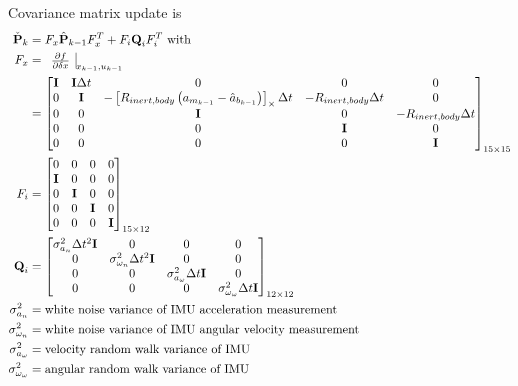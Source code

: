 \documentclass{article}
\begin{document}
Covariance matrix update is
\begin{align}
    \Check{\textbf{P}}_k &= F_x\hat{\textbf{P}}_{k-1}F_x^T + F_i\textbf{Q}_iF_i^T \text{ with} \\
    F_x &=\begin{array}{c|} \frac{\partial f}{\partial \delta x} \end{array}_{x_{k-1},u_{k-1}} \\
    &= \left[\begin{matrix}{}\textbf{I} & \textbf{I}\Delta t & 0 & 0 & 0 \\ 0 & \textbf{I} & -\left[R_{inert,body}\left(a_{m_{k-1}}-\hat{a}_{b_{k-1}}\right)\right]_\times\Delta t & -R_{inert,body}\Delta t & 0 \\ 0&0&\textbf{I}&0&-R_{inert,body}\Delta t \\ 0&0&0&\textbf{I}&0\\0&0&0&0&\textbf{I}\end{matrix}\right]_{15\times15} \\
    F_i &= \left[\begin{matrix}{} 0&0&0&0 \\ \textbf{I}&0&0&0 \\ 0&\textbf{I}&0&0 \\ 0&0&\textbf{I}&0 \\ 0&0&0&\textbf{I} \end{matrix}\right]_{15\times12} \\
    \textbf{Q}_i &= \left[\begin{matrix}{} \sigma_{a_n}^2\Delta t^2\textbf{I}&0&0&0 \\ 0&\sigma_{\omega_n}^2\Delta t^2\textbf{I}&0&0 \\ 0&0&\sigma_{a_\omega}^2\Delta t\textbf{I}&0 \\ 0&0&0&\sigma_{\omega_\omega}^2\Delta t\textbf{I} \end{matrix}\right]_{12\times12} \\
    \sigma_{a_n}^2 &= \text{white noise variance of IMU acceleration measurement} \\
    \sigma_{\omega_n}^2 &= \text{white noise variance of IMU angular velocity measurement} \\
    \sigma_{a_\omega}^2 &= \text{velocity random walk variance of IMU} \\
    \sigma_{\omega_\omega}^2 &= \text{angular random walk variance of IMU}
\end{align}{}
\end{document}
